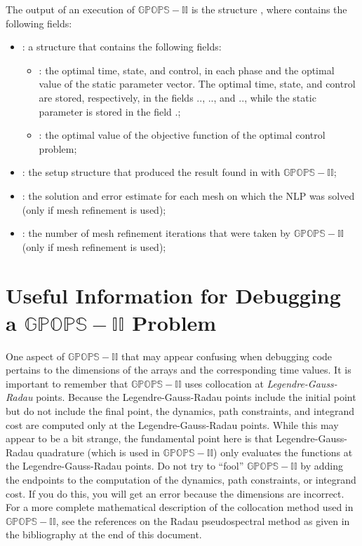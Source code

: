 \documentclass[10pt]{article}
\newcommand{\bfblue}[1]{\textrm{{\color{blue}{\bf #1}}}}
\newcommand{\slred}[1]{\textrm{\color{red}{\sl #1}}}
\begin{document}
The output of an execution of $\mathbb{GPOPS-II}$ is the structure \slred{output},
where \slred{output} contains the following fields:
\begin{itemize}
  \item \bfblue{result}:  a structure that contains the following fields:
    \begin{itemize}
      \item \bfblue{solution}:  the optimal time, state, and control,
        in each phase and the optimal value of the static parameter
        vector.  The optimal time, state, and control are stored, 
        respectively, in the fields \bfblue{solution}.\bfblue{phase($p$)}.\bfblue{time},
        \bfblue{solution}.\bfblue{phase($p$)}.\bfblue{state}, and
        \bfblue{solution}.\bfblue{phase($p$)}.\bfblue{control}, while the 
        static parameter is stored in the field
        \bfblue{solution}.\bfblue{parameter}; 
      \item \bfblue{objective}:  the optimal value of the objective function of the optimal control problem;
      \end{itemize}
      \item \bfblue{result.setup}:  the setup structure that produced the result found in \bfblue{result} with $\mathbb{GPOPS-II}$;
      \item \bfblue{meshhistory}:  the solution and error estimate for each mesh on
        which the NLP was solved (only if mesh refinement is used);
      \item \bfblue{meshiterations}:  the number of mesh refinement
        iterations that were taken by $\mathbb{GPOPS-II}$ (only if mesh refinement is used);
\end{itemize}

\section{Useful Information for Debugging a $\mathbb{GPOPS-II}$ Problem}

One aspect of $\mathbb{GPOPS-II}$ that may appear confusing when debugging
code pertains to the dimensions of the arrays and the corresponding
time values.  It is important to remember that $\mathbb{GPOPS-II}$ uses
collocation at {\em Legendre-Gauss-Radau} points.  Because the
Legendre-Gauss-Radau points include the initial point but do not
include the final point, the dynamics, path constraints, and integrand
cost are computed only at the Legendre-Gauss-Radau points.  While this
may appear to be a bit strange, the fundamental point here is that
Legendre-Gauss-Radau quadrature (which is used in $\mathbb{GPOPS-II}$) only
evaluates the functions at the Legendre-Gauss-Radau points.  Do not
try to ``fool'' $\mathbb{GPOPS-II}$ by adding the endpoints to the computation of
the dynamics, path constraints, or integrand cost.  If you do this,
you will get an error because the dimensions are incorrect.  For a
more complete mathematical description of the collocation method used
in $\mathbb{GPOPS-II}$, see the references on the Radau pseudospectral method as
given in the bibliography at the end of this document. 
\end{document}
